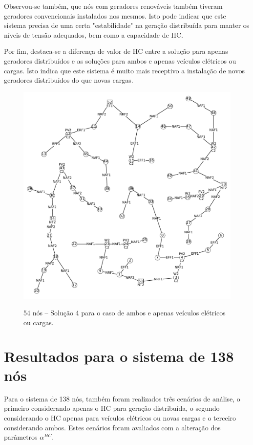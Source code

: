 Observou-se também, que nós com geradores renováveis também tiveram geradores convencionais instalados nos mesmos. Isto pode indicar que este sistema precisa de uma certa "estabilidade"\; na geração distribuída para manter os níveis de tensão adequados, bem como a capacidade de \ac{HC}.

Por fim, destaca-se a diferença de valor de \ac{HC} entre a solução para apenas geradores distribuídos e as soluções para ambos e apenas veículos elétricos ou cargas. Isto indica que este sistema é muito mais receptivo a instalação de novos geradores distribuídos do que novas cargas.

\begin{figure}[h]
 	\centering
    \caption{54 nós -- Solução 4 para o caso de ambos e apenas veículos elétricos ou cargas.}
    \includegraphics[width=1.02\textwidth]{cap4/resultados/54_bus_both4.pdf}\\
    \label{fig:54_both4}
\end{figure}

\newpage
\section{Resultados para o sistema de 138 nós}

Para o sistema de 138 nós, também foram realizados três cenários de análise, o primeiro considerando apenas o \ac{HC} para geração distribuída, o segundo considerando o \ac{HC} apenas para veículos elétricos ou novas cargas e o terceiro considerando ambos. Estes cenários foram avaliados com a alteração dos parâmetros $\alpha^{HC}$.


